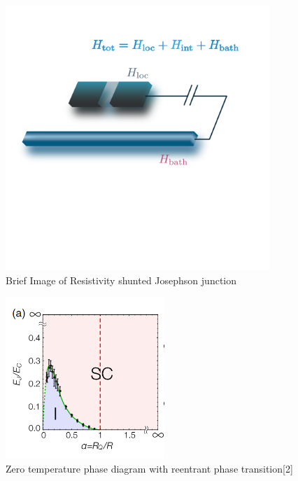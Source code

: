 \documentclass{article}[12pt]
\numberwithin{equation}{section}
\begin{document}
\begin{spacing}{1.5}
\begin{figure}[htbp]
  \centerline{\includegraphics[width=10cm]{TexFigure/Junction_RE.png}}
  \caption{Brief Image of Resistivity shunted Josephson junction}
  \label{fig:RSJJ}
\end{figure}

\begin{figure}[htbp]
  \centerline{\includegraphics[width=6cm]{TexFigure/kps_INT_exp.PNG}}
  \caption{Zero temperature phase diagram with reentrant phase transition[2]}
  \label{fig:reentrant}
\end{figure}




\end{spacing}
\end{document}
